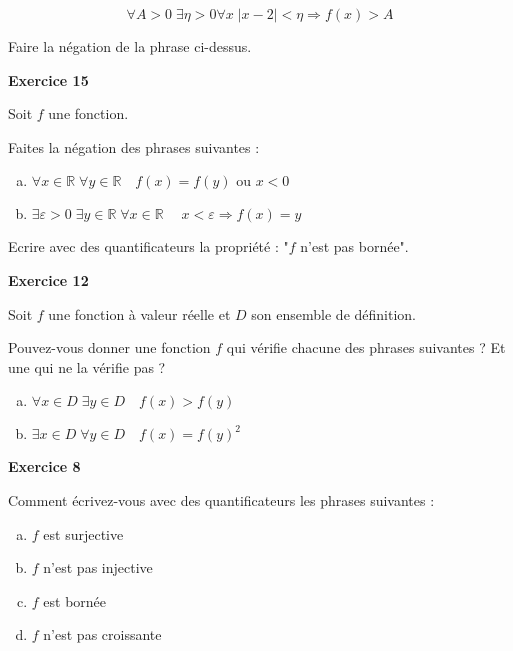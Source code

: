 ﻿\documentclass[11pt,a4paper]{amsart}
\theoremstyle{theorem}
\theoremstyle{definition}
\newcommand{\eps}{\varepsilon}
\def\RR{{\mathbb R}}
\newcounter{qcounter}
\newcounter{qscounter}
\begin{document}
$$\forall A>0\;\exists \eta>0\forall x\; |x-2|<\eta\Rightarrow f(x)>A$$

\question Faire la négation de la phrase ci-dessus.

\setcounter{qcounter}{0} \setcounter{qscounter}{0}\textbf{Exercice 15}

Soit $f$ une fonction.

\question  Faites la négation des phrases suivantes :


\begin{enumerate}[a)]
\item $\forall x\in\RR \;\forall y\in\RR \quad f(x)=f(y) \text{  ou  } x<0$
\item $\exists \eps>0\;\exists y\in\RR\;\forall x\in \RR\;\quad x<\eps\Rightarrow f(x)=y$ 
\end{enumerate}

\question Ecrire avec des quantificateurs la propriété : "$f$ n'est pas bornée".

\setcounter{qcounter}{0} \setcounter{qscounter}{0}\textbf{Exercice 12}

Soit $f$ une fonction à valeur réelle et $D$ son ensemble de définition.

 Pouvez-vous donner une fonction $f$ qui vérifie chacune des phrases suivantes ? Et une qui ne la vérifie pas ?
 
 \begin{enumerate}[a)]
 \item $\forall x\in D \;\exists y\in D\quad f(x)>f(y)$
 \item $\exists x\in D\; \forall y\in D\quad f(x)=f(y)^2$
 \end{enumerate}


\setcounter{qcounter}{0} \setcounter{qscounter}{0}\textbf{Exercice 8}

Comment écrivez-vous avec des quantificateurs les phrases suivantes :

\begin{enumerate}[a)]
\item $f$ est surjective
\item $f$ n'est pas injective
\item $f$ est bornée
\item $f$ n'est pas croissante
\end{enumerate}

\setcounter{qcounter}{0} \setcounter{qscounter}{0}
\end{document}
